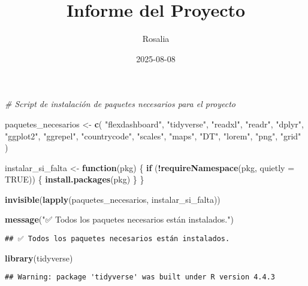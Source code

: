 \documentclass[
]{article}
\title{Informe del Proyecto}
\author{Rosalia}
\date{2025-08-08}
\newenvironment{Shaded}{\begin{snugshade}}{\end{snugshade}}
\newcommand{\AttributeTok}[1]{\textcolor[rgb]{0.13,0.29,0.53}{#1}}
\newcommand{\CommentTok}[1]{\textcolor[rgb]{0.56,0.35,0.01}{\textit{#1}}}
\newcommand{\ConstantTok}[1]{\textcolor[rgb]{0.56,0.35,0.01}{#1}}
\newcommand{\ControlFlowTok}[1]{\textcolor[rgb]{0.13,0.29,0.53}{\textbf{#1}}}
\newcommand{\FunctionTok}[1]{\textcolor[rgb]{0.13,0.29,0.53}{\textbf{#1}}}
\newcommand{\NormalTok}[1]{#1}
\newcommand{\OtherTok}[1]{\textcolor[rgb]{0.56,0.35,0.01}{#1}}
\newcommand{\SpecialCharTok}[1]{\textcolor[rgb]{0.81,0.36,0.00}{\textbf{#1}}}
\newcommand{\StringTok}[1]{\textcolor[rgb]{0.31,0.60,0.02}{#1}}
\begin{document}
\maketitle

\begin{Shaded}
\begin{Highlighting}[]
\CommentTok{\# Script de instalación de paquetes necesarios para el proyecto}

\NormalTok{paquetes\_necesarios }\OtherTok{\textless{}{-}} \FunctionTok{c}\NormalTok{(}
  \StringTok{"flexdashboard"}\NormalTok{, }\StringTok{"tidyverse"}\NormalTok{, }\StringTok{"readxl"}\NormalTok{, }\StringTok{"readr"}\NormalTok{, }\StringTok{"dplyr"}\NormalTok{, }\StringTok{"ggplot2"}\NormalTok{,}
  \StringTok{"ggrepel"}\NormalTok{, }\StringTok{"countrycode"}\NormalTok{, }\StringTok{"scales"}\NormalTok{, }\StringTok{"maps"}\NormalTok{, }\StringTok{"DT"}\NormalTok{, }\StringTok{"lorem"}\NormalTok{, }\StringTok{"png"}\NormalTok{, }\StringTok{"grid"}
\NormalTok{)}

\NormalTok{instalar\_si\_falta }\OtherTok{\textless{}{-}} \ControlFlowTok{function}\NormalTok{(pkg) \{}
  \ControlFlowTok{if}\NormalTok{ (}\SpecialCharTok{!}\FunctionTok{requireNamespace}\NormalTok{(pkg, }\AttributeTok{quietly =} \ConstantTok{TRUE}\NormalTok{)) \{}
    \FunctionTok{install.packages}\NormalTok{(pkg)}
\NormalTok{  \}}
\NormalTok{\}}

\FunctionTok{invisible}\NormalTok{(}\FunctionTok{lapply}\NormalTok{(paquetes\_necesarios, instalar\_si\_falta))}

\FunctionTok{message}\NormalTok{(}\StringTok{"✅ Todos los paquetes necesarios están instalados."}\NormalTok{)}
\end{Highlighting}
\end{Shaded}

\begin{verbatim}
## ✅ Todos los paquetes necesarios están instalados.
\end{verbatim}

\begin{Shaded}
\begin{Highlighting}[]
\FunctionTok{library}\NormalTok{(tidyverse)}
\end{Highlighting}
\end{Shaded}

\begin{verbatim}
## Warning: package 'tidyverse' was built under R version 4.4.3
\end{verbatim}
\end{document}
